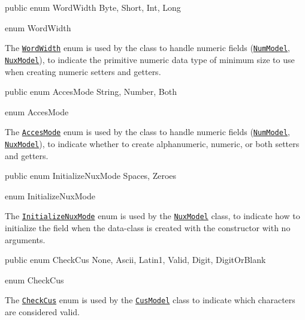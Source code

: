 \begin{elisting}
\begin{javacode}
public enum WordWidth { Byte, Short, Int, Long }
\end{javacode}
\caption{enum WordWidth}\label{lst:WordWidth}
\end{elisting}
The \hyperref[lst:WordWidth]{\texttt{WordWidth}} enum is used by the class to 
handle numeric fields (\hyperref[lst:NumModel]{\texttt{NumModel}},
\hyperref[lst:NuxModel]{\texttt{NuxModel}}), to indicate the primitive numeric 
data type of minimum size to use when creating numeric setters and getters.

\begin{elisting}
\begin{javacode}
public enum AccesMode { String, Number, Both }
\end{javacode}
\caption{enum AccesMode}\label{lst:AccesMode}
\end{elisting}
The \hyperref[lst:AccesMode]{\texttt{AccesMode}} enum is used by the class to 
handle numeric fields (\hyperref[lst:NumModel]{\texttt{NumModel}},
\hyperref[lst:NuxModel]{\texttt{NuxModel}}), to indicate whether to create 
alphanumeric, numeric, or both setters and getters.

\begin{elisting}
\begin{javacode}
public enum InitializeNuxMode { Spaces, Zeroes }
\end{javacode}
\caption{enum InitializeNuxMode}\label{lst:InitializeNuxMode}
\end{elisting}
The \hyperref[lst:InitializeNuxMode]{\texttt{InitializeNuxMode}} enum is used 
by the \hyperref[lst:NuxModel]{\texttt{NuxModel}} class, to indicate how to 
initialize the field when the data-class is created with the constructor with 
no arguments.

\begin{elisting}
\begin{javacode}
public enum CheckCus { None, Ascii, Latin1, Valid, Digit, DigitOrBlank }
\end{javacode}
\caption{enum CheckCus}\label{lst:CheckCus}
\end{elisting}
The \hyperref[lst:CheckCus]{\texttt{CheckCus}} enum is used by the 
\hyperref[lst:CusModel]{\texttt{CusModel}} class to indicate which characters 
are considered valid.

